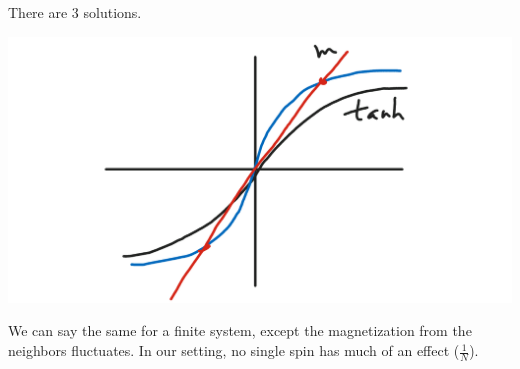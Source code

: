 There are 3 solutions.

\begin{center}\includegraphics[scale=.25]{images/4-26-5}\end{center}

We can say the same for a finite system, except the magnetization from the neighbors fluctuates. In our setting, no single spin has much of an effect ($\frac{1}{N}$). 
